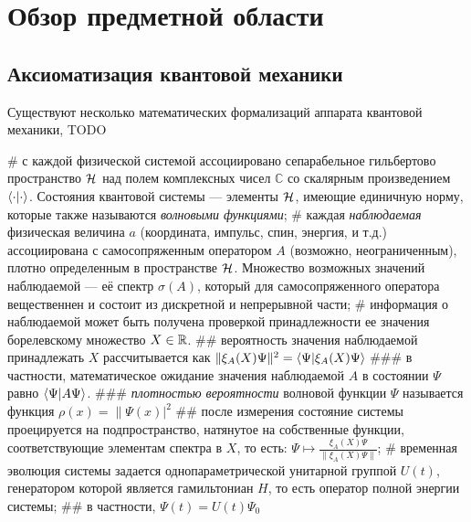 \chapter{Обзор предметной области}
\label{chapter1}



\section{Аксиоматизация квантовой механики}


Существуют несколько математических формализаций аппарата квантовой механики, TODO

\begin{easylist}[itemize]
# с каждой физической системой ассоциировано сепарабельное гильбертово пространство $\mathcal{H}_{}$ над полем комплексных чисел $\mathbb{C}$ со скалярным произведением $\ip{\cdot}{\cdot}$. Состояния квантовой системы — элементы $\mathcal{H}_{}$, имеющие единичную норму, которые также называются \textit{волновыми функциями};
# каждая \textit{наблюдаемая} физическая величина $a$ (координата, импульс, спин, энергия, и т.д.) ассоциирована с самосопряженным оператором $A$ (возможно, неограниченным), плотно определенным в пространстве $\mathcal{H}_{}$. Множество возможных значений наблюдаемой — её спектр $\sigma(A)$, который для самосопряженного оператора вещественнен и состоит из дискретной и непрерывной части;
# информация о наблюдаемой может быть получена проверкой принадлежности ее значения борелевскому множество $X \in \mathbb{R}$.
## вероятность значения наблюдаемой принадлежать $X$ рассчитывается как $\| \xi_A(X) \Psi \|^2 = \ip{\Psi}{\xi_A(X) \Psi}$
### в частности, математическое ожидание значения наблюдаемой $A$ в состоянии $\Psi$ равно $\ip{\Psi}{A \Psi}$.
### \textit{плотностью вероятности} волновой функции $\Psi$ называется функция $\rho(x) = \|\Psi(x)|^2$ 
## после измерения состояние системы проецируется на подпространство, натянутое на собственные функции, соответствующие элементам спектра в $X$, то есть: $\Psi \mapsto \frac{\xi_A(X) \Psi}{\| \xi_A(X) \Psi \|}$;
# временная эволюция системы задается однопараметрической унитарной группой $U(t)$, генератором которой является гамильтониан $H$, то есть оператор полной энергии системы;
## в частности, $\Psi(t) = U(t) \Psi_0$
\end{easylist}

